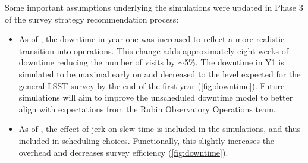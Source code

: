 Some important assumptions underlying the simulations were updated in Phase 3 of the survey strategy recommendation process: 

\begin{itemize}
\item As of , the downtime in year one was increased to reflect a more realistic transition into operations. This change adds approximately eight weeks of downtime reducing the number of visits by \mbox{$\sim$5\%}. The downtime in Y1 is simulated to be maximal early on and decreased to the level expected for the general LSST survey by the end of the first year (\autoref{fig:downtime}). Future simulations will aim to improve the unscheduled downtime model to better align with expectations from the Rubin Observatory Operations team. 

\item As of , the effect of jerk on slew time is included in the simulations, and thus included in scheduling choices. Functionally, this slightly increases the overhead and decreases survey efficiency (\autoref{fig:downtime}).


\end{itemize}
